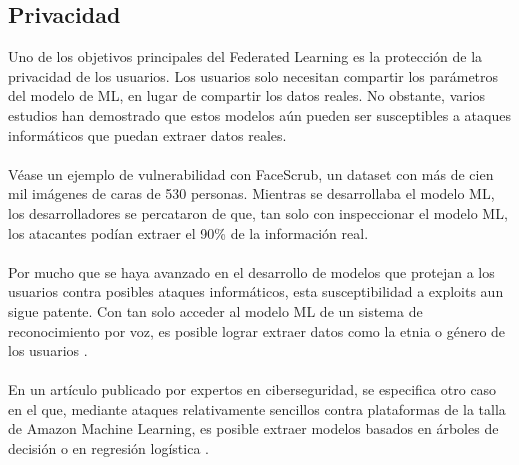 \subsection{Privacidad}
Uno de los objetivos principales del Federated Learning es la protección de la privacidad de los usuarios. Los usuarios solo necesitan compartir los parámetros del modelo de ML, en lugar de compartir los datos reales. No obstante, varios estudios han demostrado que estos modelos aún pueden ser susceptibles a ataques informáticos que puedan extraer datos reales.
\\ \\
Véase un ejemplo de vulnerabilidad con FaceScrub, un dataset con más de cien mil imágenes de caras de 530 personas. Mientras se desarrollaba el modelo ML, los desarrolladores se percataron de que, tan solo con inspeccionar el modelo ML, los atacantes podían extraer el 90\% de la información real.
\\ \\
Por mucho que se haya avanzado en el desarrollo de modelos que protejan a los usuarios contra posibles ataques informáticos, esta susceptibilidad a exploits aun sigue patente. Con tan solo acceder al modelo ML de un sistema de reconocimiento por voz, es posible lograr extraer datos como la etnia o género de los usuarios \autocite{melis2018exploiting}. 
\\ \\
En un artículo publicado por expertos en ciberseguridad, se especifica otro caso en el que, mediante ataques relativamente sencillos contra plataformas de la talla de Amazon Machine Learning, es posible extraer modelos basados en árboles de decisión o en regresión logística \autocite{tramèr2016stealing}.

